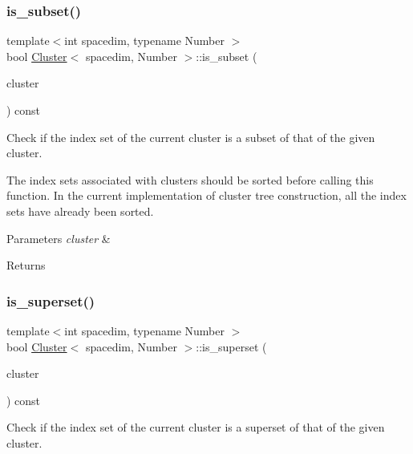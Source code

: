 \subsubsection{\texorpdfstring{is\+\_\+subset()}{is\_subset()}}
{\footnotesize\ttfamily template$<$int spacedim, typename Number $>$ \\
bool \hyperlink{classCluster}{Cluster}$<$ spacedim, Number $>$\+::is\+\_\+subset (\begin{DoxyParamCaption}\item[{const \hyperlink{classCluster}{Cluster}$<$ spacedim, Number $>$ \&}]{cluster }\end{DoxyParamCaption}) const}

Check if the index set of the current cluster is a subset of that of the given cluster.


\begin{DoxyDescription}
\item[Note ]The index sets associated with clusters should be sorted before calling this function. In the current implementation of cluster tree construction, all the index sets have already been sorted. 
\end{DoxyDescription}
\begin{DoxyParams}{Parameters}
{\em cluster} & \\
\hline
\end{DoxyParams}
\begin{DoxyReturn}{Returns}

\end{DoxyReturn}
\mbox{\label{classCluster_abdc3b12ac53ba6fba8479a9bbd9b6aa2}} 
\subsubsection{\texorpdfstring{is\+\_\+superset()}{is\_superset()}}
{\footnotesize\ttfamily template$<$int spacedim, typename Number $>$ \\
bool \hyperlink{classCluster}{Cluster}$<$ spacedim, Number $>$\+::is\+\_\+superset (\begin{DoxyParamCaption}\item[{const \hyperlink{classCluster}{Cluster}$<$ spacedim, Number $>$ \&}]{cluster }\end{DoxyParamCaption}) const}

Check if the index set of the current cluster is a superset of that of the given cluster.


